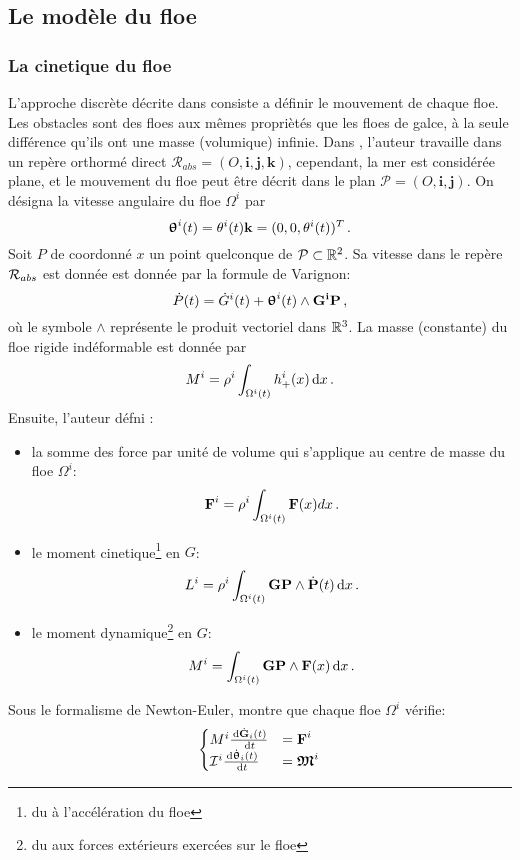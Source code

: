 \subsection{Le modèle du floe}

\subsubsection{La cinetique du floe}

L'approche discrète décrite dans \parencite{rabatel2015thesis} consiste a définir le mouvement de chaque floe. Les obstacles sont des floes aux mêmes propriètés que les floes de galce, à la seule différence qu'ils ont une masse (volumique) infinie. Dans \parencite{rabatel2015thesis}, l'auteur travaille dans un repère orthormé direct $\mathcal{R}_{abs} = (O, \bm i, \bm j, \bm k)$, cependant, la mer est considérée plane, et le mouvement du floe peut être décrit dans le plan $\mathcal{P} = (O, \bm i, \bm j)$. On désigna la vitesse angulaire du floe $\Omega^i$ par 
$$
\bm{\mathrm{\uptheta}}^i(t) = \theta^i(t)\bm{\mathrm{k}} = (0,0,\theta^i(t))^T \,.
$$
Soit $P$ de coordonné $x$ un point quelconque de $\mathcal{P} \subset \mathbb{R}^2$. Sa vitesse dans le repère $\mathcal{R}_{abs}$ est donnée est donnée par la formule de Varignon:
$$
\dot{P}(t) = \dot{G}^i(t) + \bm{\uptheta}^i(t) \wedge \bm{\mathrm{G^iP}} \,,
$$
où le symbole $\wedge$ représente le produit vectoriel dans $\mathbb{R}^3$. La masse (constante) du floe rigide indéformable est donnée par 
$$
M^i = \rho^i \int_{\Omega^i(t)} \hplus^i (x) \diff x \,.
$$
Ensuite, l'auteur défni :
\begin{itemize}
    \item la somme des force par unité de volume qui s'applique au centre de masse du floe $\Omega^i$: $$\bm{\mathrm{F}}^i = \rho^i \int_{\Omega^i(t)} \bm{\mathrm{F}}(x) dx \,.$$
    \item le moment cinetique\footnote{du à l'accélération du floe} en $G$: $$L^i = \rho^i \intO{i} \bvec{GP} \wedge \dot{\bvec{P}}(t) \diff x \,.$$
    \item le moment dynamique\footnote{du aux forces extérieurs exercées sur le floe} en $G$: $$\bvec \mathfrak{M}^i = \intO{i} \bvec{GP} \wedge \bvec{F}(x) \diff x \,.$$
\end{itemize}
Sous le formalisme de Newton-Euler, \citeauthor{rabatel2015thesis} montre que chaque floe $\Omega^i$ vérifie:
$$
    \begin{cases}
        M^i \frac{\diff \dot{\bvec{G}}_i(t)}{\diff t} &= \bvec{F}^i \\
        \mathcal{I}^i \frac{\diff \dot{\bvec{\uptheta}}_i(t)}{\diff t} &= \bvec{\mathfrak{M}}^i
    \end{cases}
$$


